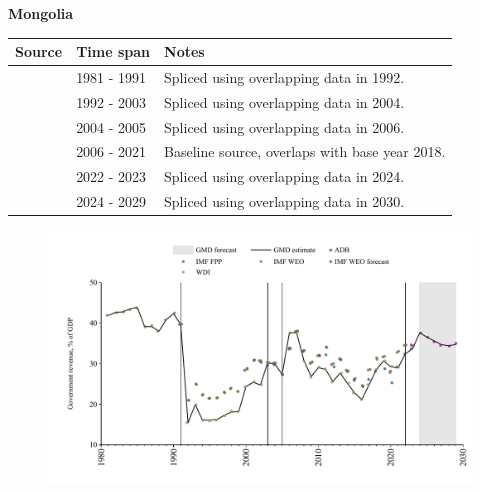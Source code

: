 \documentclass[12pt,a4paper,landscape]{article}
\begin{document}
\begin{adjustbox}{max totalsize={\paperwidth}{\paperheight},center}
\begin{minipage}[t][\textheight][t]{\textwidth}
\vspace*{0.5cm}
{}
\begin{center}
{\Large\bfseries Mongolia}
\end{center}
\vspace{0.5cm}
\begin{table}[H]
\centering
\small
\begin{tabular}{|l|l|l|}
\hline
\textbf{Source} & \textbf{Time span} & \textbf{Notes} \\
\hline
\rowcolor{white}\cite{IMF_WEO}& 1981 - 1991 &Spliced using overlapping data in 1992.\\
\rowcolor{lightgray}\cite{WDI}& 1992 - 2003 &Spliced using overlapping data in 2004.\\
\rowcolor{white}\cite{ADB}& 2004 - 2005 &Spliced using overlapping data in 2006.\\
\rowcolor{lightgray}\cite{WDI}& 2006 - 2021 &Baseline source, overlaps with base year 2018.\\
\rowcolor{white}\cite{ADB}& 2022 - 2023 &Spliced using overlapping data in 2024.\\
\rowcolor{lightgray}\cite{IMF_WEO_forecast}& 2024 - 2029 &Spliced using overlapping data in 2030.\\
\hline
\end{tabular}
\end{table}
\begin{figure}[H]
\centering
\includegraphics[width=\textwidth,height=0.6\textheight,keepaspectratio]{graphs/MNG_govrev_GDP.pdf}
\end{figure}
\end{minipage}
\end{adjustbox}
\end{document}
